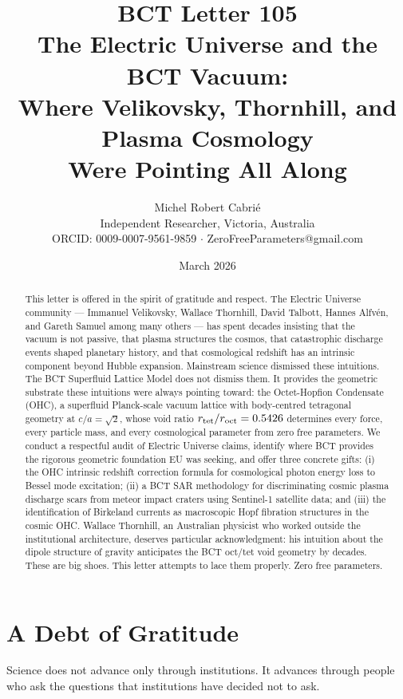 \documentclass[twocolumn,10pt]{article}
\title{\textbf{BCT Letter 105}\\
The Electric Universe and the BCT Vacuum:\\
Where Velikovsky, Thornhill, and Plasma Cosmology\\
Were Pointing All Along}
\author{Michel Robert Cabri\'{e}\\
\small Independent Researcher, Victoria, Australia\\
\small ORCID: 0009-0007-9561-9859 $\cdot$ ZeroFreeParameters@gmail.com}
\date{March 2026}
\begin{document}
\maketitle

\begin{abstract}
This letter is offered in the spirit of gratitude and respect.
The Electric Universe community --- Immanuel Velikovsky, Wallace Thornhill,
David Talbott, Hannes Alfv\'{e}n, and Gareth Samuel among many others ---
has spent decades insisting that the vacuum is not passive, that plasma
structures the cosmos, that catastrophic discharge events shaped planetary
history, and that cosmological redshift has an intrinsic component beyond
Hubble expansion. Mainstream science dismissed these intuitions. The BCT
Superfluid Lattice Model does not dismiss them. It provides the geometric
substrate these intuitions were always pointing toward: the
Octet-Hopfion Condensate (OHC), a superfluid Planck-scale vacuum lattice
with body-centred tetragonal geometry at $c/a = \sqrt{2}$, whose void
ratio $r_{\rm tet}/r_{\rm oct} = 0.5426$ determines every force, every
particle mass, and every cosmological parameter from zero free parameters.
We conduct a respectful audit of Electric Universe claims, identify where
BCT provides the rigorous geometric foundation EU was seeking, and offer
three concrete gifts: (i) the OHC intrinsic redshift correction formula
for cosmological photon energy loss to Bessel mode excitation; (ii) a BCT
SAR methodology for discriminating cosmic plasma discharge scars from
meteor impact craters using Sentinel-1 satellite data; and (iii) the
identification of Birkeland currents as macroscopic Hopf fibration
structures in the cosmic OHC.
Wallace Thornhill, an Australian physicist who worked outside the
institutional architecture, deserves particular acknowledgment: his
intuition about the dipole structure of gravity anticipates the BCT
oct/tet void geometry by decades. These are big shoes.
This letter attempts to lace them properly.
Zero free parameters.
\end{abstract}

\maketitle

\section{A Debt of Gratitude}

Science does not advance only through institutions. It advances through
people who ask the questions that institutions have decided not to ask.
\end{document}
